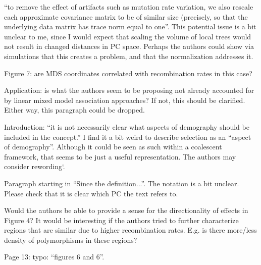 \begin{point}{}
``to remove the effect of artifacts such as mutation rate variation, we also rescale each
approximate covariance matrix to be of similar size (precisely, so that the underlying data
matrix has trace norm equal to one''. This potential issue is a bit unclear to me, since I would
expect that scaling the volume of local trees would not result in changed distances in PC
space. Perhaps the authors could show via simulations that this creates a problem, and that the
normalization addresses it.
\end{point}

\begin{point}{Figure 7:}
are MDS coordinates correlated with recombination rates in this case?
\end{point}

\begin{point}{Application:}
 is what the authors seem to be proposing not already accounted for by linear
mixed model association approaches? If not, this should be clarified. Either way, this paragraph
could be dropped.
\end{point}

\begin{point}{Introduction:}
 ``it is not necessarily clear what aspects of demography should be included in the
concept.'' I find it a bit weird to describe selection as an ``aspect of demography''. Although it
could be seen as such within a coalescent framework, that seems to be just a useful
representation. The authors may consider rewording`.
\end{point}

\begin{point}{}
Paragraph starting in ``Since the definition...''. The notation is a bit unclear. Please check that it
is clear which PC the text refers to.
\end{point}

\begin{point}{}
Would the authors be able to provide a sense for the directionality of effects in Figure 4? It
would be interesting if the authors tried to further characterize regions that are similar due to
higher recombination rates. E.g. is there more/less density of polymorphisms in these regions?
\end{point}

\begin{point}{Page 13:}
typo: ``figures 6 and 6''.
\end{point}

